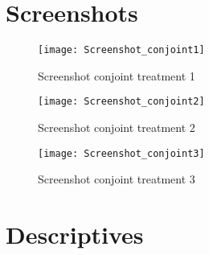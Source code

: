 \documentclass[12pt]{article}
\begin{document}
\begin{appendices}
\setcounter{section}{0}
\renewcommand\thesection{\Alph{section}}
\renewcommand\thesubsection{\Alph{section}\arabic{subsection}}
\renewcommand\thefigure{\Alph{section}\arabic{figure}}
\renewcommand\thetable{\Alph{section}\arabic{table}}

\setcounter{table}{0}
\setcounter{figure}{0}


\label{Appendix_Design}

\section{Screenshots}

\setcounter{page}{1}

\begin{figure}[H]
\caption{Screenshot conjoint treatment 1}\label{fig:screen_one}
\centerline{\texttt{[image: Screenshot\_conjoint1]}}
\end{figure}

\begin{figure}[H]
\caption{Screenshot conjoint treatment 2}\label{fig:screen_two}
\centerline{\texttt{[image: Screenshot\_conjoint2]}}
\end{figure}

\begin{figure}[H]
\caption{Screenshot conjoint treatment 3}\label{fig:screen_three}
\centerline{\texttt{[image: Screenshot\_conjoint3]}}
\end{figure}

\section{Descriptives}




\singlespace




\end{appendices}
\end{document}
